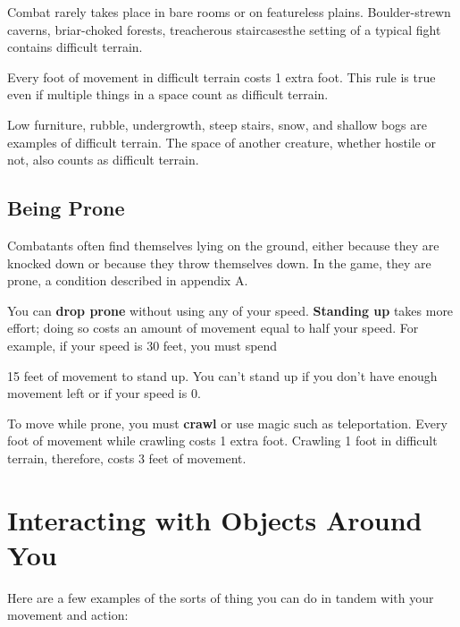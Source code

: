 Combat rarely takes place in bare rooms or on featureless plains. Boulder-strewn caverns, briar-choked forests, treacherous staircases\textemdash the setting of a typical fight contains difficult terrain.

Every foot of movement in difficult terrain costs 1 extra foot. This rule is true even if multiple things in a space count as difficult terrain.

Low furniture, rubble, undergrowth, steep stairs, snow, and shallow bogs are examples of difficult terrain. The space of another creature, whether hostile or not, also counts as difficult terrain.

\subsection{Being Prone}

Combatants often find themselves lying on the ground, either because they are knocked down or because they throw themselves down. In the game, they are prone, a condition described in appendix A.

You can \textbf{drop prone} without using any of your speed. \textbf{Standing up} takes more effort; doing so costs an amount of movement equal to half your speed. For example, if your speed is 30 feet, you must spend

15 feet of movement to stand up. You can't stand up if you don't have enough movement left or if your speed is 0.

To move while prone, you must \textbf{crawl} or use magic such as teleportation. Every foot of movement while crawling costs 1 extra foot. Crawling 1 foot in difficult terrain, therefore, costs 3 feet of movement.

\section{Interacting with Objects Around You}

Here are a few examples of the sorts of thing you can do in tandem with your movement and action:


